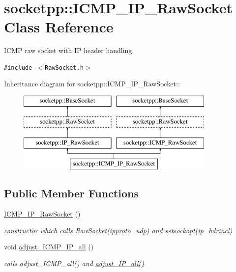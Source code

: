 \hypertarget{classsocketpp_1_1ICMP__IP__RawSocket}{
\section{socketpp::ICMP\_\-IP\_\-RawSocket Class Reference}
\label{classsocketpp_1_1ICMP__IP__RawSocket}
}
ICMP raw socket with IP header handling.  


{\tt \#include $<$RawSocket.h$>$}

Inheritance diagram for socketpp::ICMP\_\-IP\_\-RawSocket::\begin{figure}[H]
\begin{center}
\leavevmode
\includegraphics[height=4cm]{classsocketpp_1_1ICMP__IP__RawSocket}
\end{center}
\end{figure}
\subsection*{Public Member Functions}
\begin{CompactItemize}
\item 
\hyperlink{classsocketpp_1_1ICMP__IP__RawSocket_c94fd53fce785a8b9ac5e53c8b1fb694}{ICMP\_\-IP\_\-RawSocket} ()
\begin{CompactList}\small\item\em constructor which calls RawSocket(ipproto\_\-udp) and setsockopt(ip\_\-hdrincl) \item\end{CompactList}\item 
void \hyperlink{classsocketpp_1_1ICMP__IP__RawSocket_c3f54f7a266586af46e4bfa4494f90d6}{adjust\_\-ICMP\_\-IP\_\-all} ()
\begin{CompactList}\small\item\em calls adjust\_\-ICMP\_\-all() and \hyperlink{classsocketpp_1_1IP__RawSocket_45e60510233daaa2f279d3a4706fdce5}{adjust\_\-IP\_\-all()} \item\end{CompactList}\end{CompactItemize}
